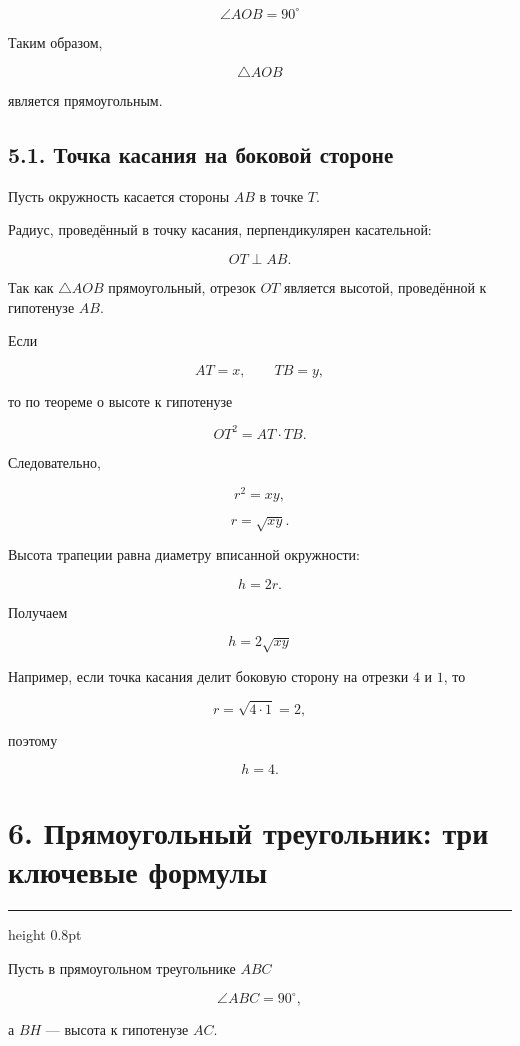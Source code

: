 \documentclass[a4paper,12pt]{article}
\newcommand{\sectionline}{
  \par
  \vspace{0.2em}
  {\color{accent}\hrule height 0.8pt}
  \vspace{0.7em}
}
\newcommand{\formula}[1]{
  \[
  \boxed{#1}
  \]
}
\begin{document}
\formula{
\angle AOB=90^\circ
}

Таким образом,

\[
\triangle AOB
\]

является прямоугольным.


\subsection*{5.1. Точка касания на боковой стороне}

Пусть окружность касается стороны $AB$ в точке $T$.

Радиус, проведённый в точку касания, перпендикулярен касательной:

\[
OT\perp AB.
\]

Так как $\triangle AOB$ прямоугольный, отрезок $OT$ является высотой,
проведённой к гипотенузе $AB$.

Если

\[
AT=x,
\qquad
TB=y,
\]

то по теореме о высоте к гипотенузе

\[
OT^2
=
AT\cdot TB.
\]

Следовательно,

\[
r^2=xy,
\]

\[
r=\sqrt{xy}.
\]

Высота трапеции равна диаметру вписанной окружности:

\[
h=2r.
\]

Получаем

\formula{
h=2\sqrt{xy}
}

Например, если точка касания делит боковую сторону на отрезки $4$ и $1$,
то

\[
r=\sqrt{4\cdot1}=2,
\]

поэтому

\[
h=4.
\]


\section*{6. Прямоугольный треугольник: три ключевые формулы}
\sectionline

Пусть в прямоугольном треугольнике $ABC$

\[
\angle ABC=90^\circ,
\]

а $BH$ --- высота к гипотенузе $AC$.
\end{document}
